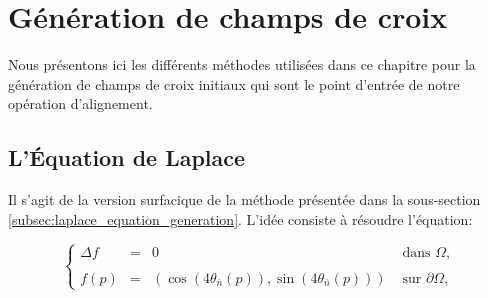 \section{Génération de champs de croix}


Nous présentons ici les différents méthodes utilisées dans ce chapitre pour la génération de champs de croix  initiaux qui sont le point d'entrée de notre opération d'alignement.

\subsection{L'\'Equation de Laplace}
\label{subsec:laplace_equation_generation_space}

Il s'agit de la version surfacique de la méthode présentée dans la sous-section \ref{subsec:laplace_equation_generation}. L'idée consiste à résoudre l'équation:

\begin{equation}
\left\{
\begin{array}{lcll}
\Delta f &=& 0 &\mbox{ dans }\Omega,\\\\
f(p)&=&\left(\cos(4\theta_{\bar{n}}(p)), \sin(4\theta_{\bar{n}}(p))\right) & \mbox{ sur } \partial\Omega,
\end{array}
\right.
\end{equation}

